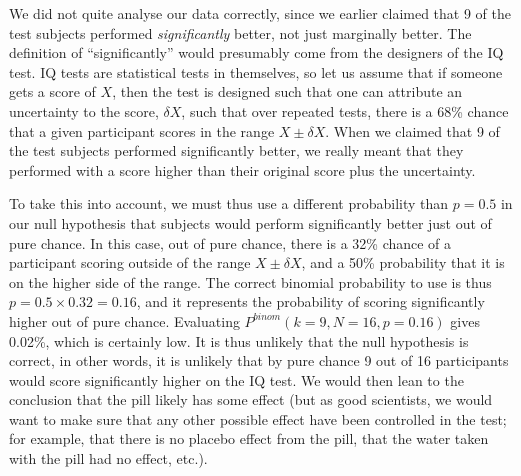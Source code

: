 We did not quite analyse our data correctly, since we earlier claimed that 9 of the test subjects performed \textit{significantly} better, not just marginally better. The definition of ``significantly'' would presumably come from the designers of the IQ test. IQ tests are statistical tests in themselves, so let us assume that if someone gets a score of $X$, then the test is designed such that one can attribute an uncertainty to the score, $\delta X$, such that over repeated tests, there is a 68\% chance that a given participant scores in the range $X \pm \delta X$. When we claimed that 9 of the test subjects performed significantly better, we really meant that they performed with a score higher than their original score plus the uncertainty.

To take this into account, we must thus use a different probability than $p=0.5$ in our null hypothesis that subjects would perform significantly better just out of pure chance. In this case, out of pure chance, there is a 32\% chance of a participant scoring outside of the range $X \pm \delta X$, and a 50\% probability that it is on the higher side of the range. The correct binomial probability to use is thus $p=0.5\times 0.32=0.16$, and it represents the probability of scoring significantly higher out of pure chance. Evaluating $P^{binom}(k=9,N=16,p=0.16)$ gives 0.02\%, which is certainly low. It is thus unlikely that the null hypothesis is correct, in other words, it is unlikely that by pure chance 9 out of 16 participants would score significantly higher on the IQ test. We would then lean to the conclusion that the pill likely has some effect (but as good scientists, we would want to make sure that any other possible effect have been controlled in the test; for example, that there is no placebo effect from the pill, that the water taken with the pill had no effect, etc.).

